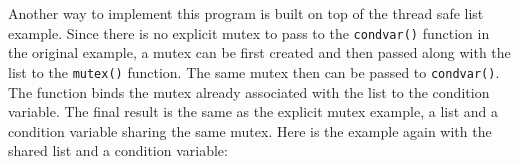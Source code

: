 
Another way to implement this program is built on top of the thread safe
list example. Since there is no explicit mutex to pass to the
\texttt{condvar()} function in the original example, a mutex
can be first created and then passed along with the list to the
\texttt{mutex()} function. The same mutex then can be passed
to \texttt{condvar()}. The function binds the mutex already
associated with the list to the condition variable. The final result is
the same as the explicit mutex example, a list and a condition variable
sharing the same mutex. Here is the example again with the shared list
and a condition variable:

